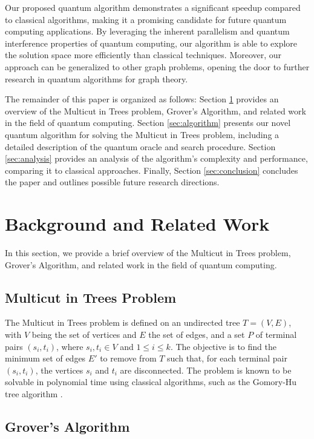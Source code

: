 Our proposed quantum algorithm demonstrates a significant speedup compared to classical algorithms, making it a promising candidate for future quantum computing applications. By leveraging the inherent parallelism and quantum interference properties of quantum computing, our algorithm is able to explore the solution space more efficiently than classical techniques. Moreover, our approach can be generalized to other graph problems, opening the door to further research in quantum algorithms for graph theory.

The remainder of this paper is organized as follows: Section \ref{sec:background} provides an overview of the Multicut in Trees problem, Grover's Algorithm, and related work in the field of quantum computing. Section \ref{sec:algorithm} presents our novel quantum algorithm for solving the Multicut in Trees problem, including a detailed description of the quantum oracle and search procedure. Section \ref{sec:analysis} provides an analysis of the algorithm's complexity and performance, comparing it to classical approaches. Finally, Section \ref{sec:conclusion} concludes the paper and outlines possible future research directions.

\section{Background and Related Work}
\label{sec:background}

In this section, we provide a brief overview of the Multicut in Trees problem, Grover's Algorithm, and related work in the field of quantum computing.

\subsection{Multicut in Trees Problem}

The Multicut in Trees problem is defined on an undirected tree $T=(V, E)$, with $V$ being the set of vertices and $E$ the set of edges, and a set $P$ of terminal pairs $(s_i, t_i)$, where $s_i, t_i \in V$ and $1 \leq i \leq k$. The objective is to find the minimum set of edges $E'$ to remove from $T$ such that, for each terminal pair $(s_i, t_i)$, the vertices $s_i$ and $t_i$ are disconnected. The problem is known to be solvable in polynomial time using classical algorithms, such as the Gomory-Hu tree algorithm \cite{gomory1961multi}.

\subsection{Grover's Algorithm}


